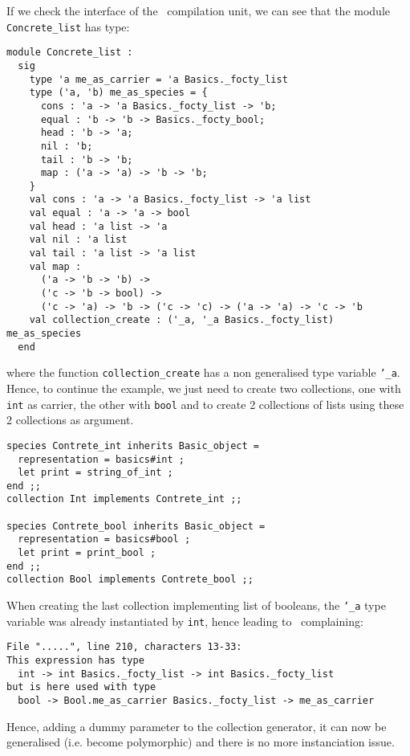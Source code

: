 If we check the interface of the \ocaml\ compilation unit, we can see
that the module {\tt Concrete\_list} has type:

{\footnotesize
\begin{lstlisting}[language=MyOCaml]
module Concrete_list :
  sig
    type 'a me_as_carrier = 'a Basics._focty_list
    type ('a, 'b) me_as_species = {
      cons : 'a -> 'a Basics._focty_list -> 'b;
      equal : 'b -> 'b -> Basics._focty_bool;
      head : 'b -> 'a;
      nil : 'b;
      tail : 'b -> 'b;
      map : ('a -> 'a) -> 'b -> 'b;
    }
    val cons : 'a -> 'a Basics._focty_list -> 'a list
    val equal : 'a -> 'a -> bool
    val head : 'a list -> 'a
    val nil : 'a list
    val tail : 'a list -> 'a list
    val map :
      ('a -> 'b -> 'b) ->
      ('c -> 'b -> bool) ->
      ('c -> 'a) -> 'b -> ('c -> 'c) -> ('a -> 'a) -> 'c -> 'b
    val collection_create : ('_a, '_a Basics._focty_list) me_as_species
  end
\end{lstlisting}}

\noindent where the function {\tt collection\_create} has a non
generalised type variable {\tt '\_a}. Hence, to continue the example,
we just need to create two collections, one with {\tt int} as carrier,
the other with {\tt bool} and to create 2 collections of lists using
these 2 collections as argument.

{\footnotesize
\begin{lstlisting}
species Contrete_int inherits Basic_object =
  representation = basics#int ;
  let print = string_of_int ;
end ;;
collection Int implements Contrete_int ;;

species Contrete_bool inherits Basic_object =
  representation = basics#bool ;
  let print = print_bool ;
end ;;
collection Bool implements Contrete_bool ;;
\end{lstlisting}}

When creating the last collection implementing list of booleans, the
{\tt '\_a} type variable was already instantiated by {\tt int}, hence
leading to \ocaml\ complaining:

\begin{verbatim}
File ".....", line 210, characters 13-33:
This expression has type
  int -> int Basics._focty_list -> int Basics._focty_list
but is here used with type
  bool -> Bool.me_as_carrier Basics._focty_list -> me_as_carrier
\end{verbatim}

Hence, adding a dummy parameter to the collection generator, it can
now be generalised (i.e. become polymorphic) and there is no more
instanciation issue.

